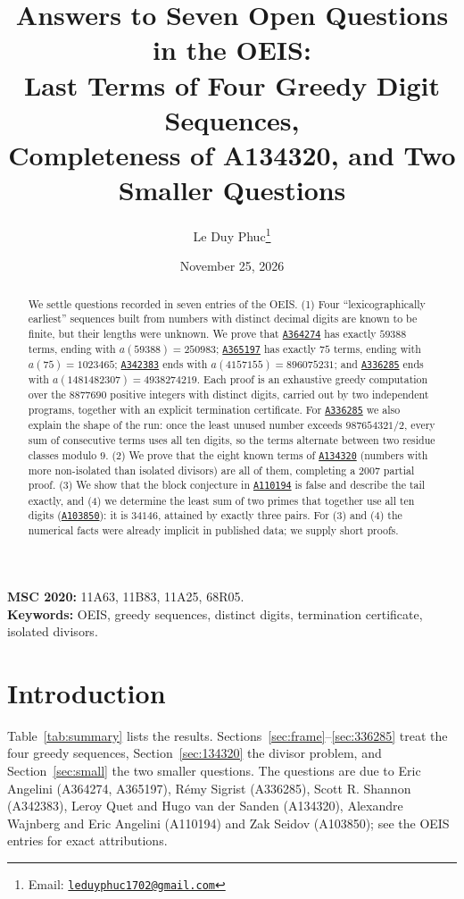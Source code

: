 \documentclass[11pt,a4paper]{article}
\title{Answers to Seven Open Questions in the OEIS:\\
Last Terms of Four Greedy Digit Sequences,\\
Completeness of A134320, and Two Smaller Questions}
\author{Le Duy Phuc\thanks{Email: \href{mailto:leduyphuc1702@gmail.com}{\texttt{leduyphuc1702@gmail.com}}}}
\date{November 25, 2026}
\theoremstyle{remark}
\newcommand{\oeis}[1]{\href{https://oeis.org/#1}{\texttt{#1}}}
\begin{document}
\maketitle

\begin{abstract}
We settle questions recorded in seven entries of the OEIS. (1) Four ``lexicographically earliest'' sequences built from numbers with distinct decimal digits are known to be finite, but their lengths were unknown. We prove that \oeis{A364274} has exactly $59388$ terms, ending with $a(59388)=250983$; \oeis{A365197} has exactly $75$ terms, ending with $a(75)=1023465$; \oeis{A342383} ends with $a(4157155)=896075231$; and \oeis{A336285} ends with $a(1481482307)=4938274219$. Each proof is an exhaustive greedy computation over the $8877690$ positive integers with distinct digits, carried out by two independent programs, together with an explicit termination certificate. For \oeis{A336285} we also explain the shape of the run: once the least unused number exceeds $987654321/2$, every sum of consecutive terms uses all ten digits, so the terms alternate between two residue classes modulo $9$. (2) We prove that the eight known terms of \oeis{A134320} (numbers with more non-isolated than isolated divisors) are all of them, completing a 2007 partial proof. (3) We show that the block conjecture in \oeis{A110194} is false and describe the tail exactly, and (4) we determine the least sum of two primes that together use all ten digits (\oeis{A103850}): it is $34146$, attained by exactly three pairs. For (3) and (4) the numerical facts were already implicit in published data; we supply short proofs.
\end{abstract}

\noindent\textbf{MSC 2020:} 11A63, 11B83, 11A25, 68R05.\\
\textbf{Keywords:} OEIS, greedy sequences, distinct digits, termination certificate, isolated divisors.

\section{Introduction}

Table~\ref{tab:summary} lists the results. Sections~\ref{sec:frame}--\ref{sec:336285} treat the four greedy sequences, Section~\ref{sec:134320} the divisor problem, and Section~\ref{sec:small} the two smaller questions. The questions are due to Eric Angelini (A364274, A365197), R\'emy Sigrist (A336285), Scott R. Shannon (A342383), Leroy Quet and Hugo van der Sanden (A134320), Alexandre Wajnberg and Eric Angelini (A110194) and Zak Seidov (A103850); see the OEIS entries for exact attributions.
\end{document}
